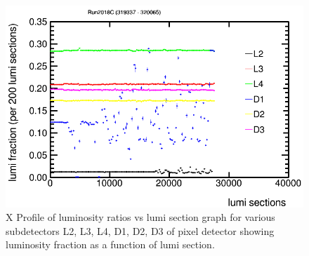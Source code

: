 \begin{figure}[H]
  \centering
  \includegraphics[width=0.5\columnwidth]{./ProfileXcombinedC_new.png}
  \caption{X Profile of luminosity ratios vs lumi section graph for various subdetectors L2, L3, L4, D1, D2, D3 of pixel detector showing luminosity fraction as a function of lumi section. \cite{lumidpg}}
  \label{fig:CMS}
\end{figure}

